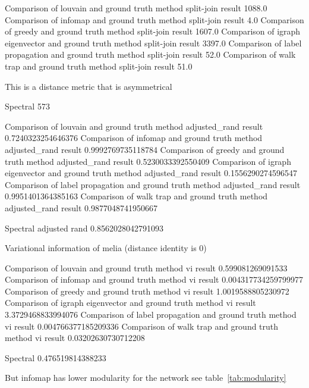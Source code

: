 




Comparison of louvain and ground truth method split-join result 1088.0
Comparison of infomap and ground truth method split-join result 4.0
Comparison of greedy and ground truth method split-join result 1607.0
Comparison of igraph eigenvector and ground truth method split-join result 3397.0
Comparison of label propagation and ground truth method split-join result 52.0
Comparison of walk trap and ground truth method split-join result 51.0

This is a distance metric that is asymmetrical

Spectral 573


Comparison of louvain and ground truth method adjusted\_rand result 0.7240323254646376
Comparison of infomap and ground truth method adjusted\_rand result 0.9992769735118784
Comparison of greedy and ground truth method adjusted\_rand result 0.5230033392550409
Comparison of igraph eigenvector and ground truth method adjusted\_rand result 0.1556290274596547
Comparison of label propagation and ground truth method adjusted\_rand result 0.9951401364385163
Comparison of walk trap and ground truth method adjusted\_rand result 0.9877048741950667


Spectral adjusted rand
0.8562028042791093

Variational information of melia (distance identity is 0)

Comparison of louvain and ground truth method vi result 0.599081269091533
Comparison of infomap and ground truth method vi result 0.004317734259799977
Comparison of greedy and ground truth method vi result 1.0019588805230972
Comparison of igraph eigenvector and ground truth method vi result 3.3729468833994076
Comparison of label propagation and ground truth method vi result 0.004766377185209336
Comparison of walk trap and ground truth method vi result 0.03202630730712208

Spectral 
0.476519814388233


But infomap has lower modularity for the network see table~\ref{tab:modularity}


